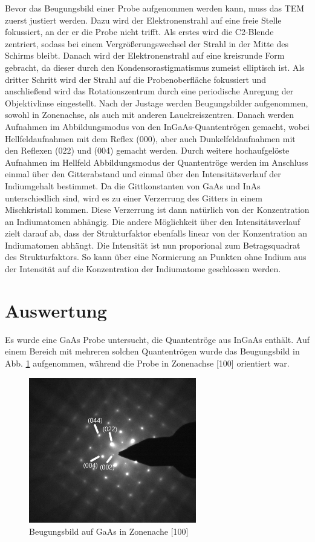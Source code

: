 \documentclass[a4paper,11pt,DIV=11]{scrartcl}
\begin{document}
Bevor das Beugungsbild einer Probe aufgenommen werden kann, muss das TEM zuerst justiert werden. Dazu wird der Elektronenstrahl auf eine freie Stelle fokussiert, an der er die Probe nicht trifft. Als erstes wird die C2-Blende zentriert, sodass bei einem Vergrößerungswechsel der Strahl in der Mitte des Schirms bleibt. Danach wird der Elektronenstrahl auf eine kreisrunde Form gebracht, da dieser durch den Kondensorastigmatismus zumeist elliptisch ist. Als dritter Schritt wird der Strahl auf die Probenoberfläche fokussiert und anschließend wird das Rotationszentrum durch eine periodische Anregung der Objektivlinse eingestellt. Nach der Justage werden Beugungsbilder aufgenommen, sowohl in Zonenachse, als auch mit anderen Lauekreiszentren. Danach werden Aufnahmen im Abbildungsmodus von den InGaAs-Quantentrögen gemacht, wobei Hellfeldaufnahmen mit dem Reflex (000), aber auch Dunkelfeldaufnahmen mit den Reflexen (022) und (004) gemacht werden. Durch weitere hochaufgelöste Aufnahmen im Hellfeld Abbildungsmodus der Quantentröge werden im Anschluss einmal über den Gitterabstand und einmal über den Intensitätsverlauf der Indiumgehalt bestimmet. Da die Gittkonstanten von GaAs und InAs unterschiedlich sind, wird es zu einer Verzerrung des Gitters in einem Mischkristall kommen. Diese Verzerrung ist dann natürlich von der Konzentration an Indiumatomen abhängig. Die andere Möglichkeit über den Intensitätsverlauf zielt darauf ab, dass der Strukturfaktor ebenfalls linear von der Konzentration an Indiumatomen abhängt. Die Intensität ist nun proporional zum Betragsquadrat des Strukturfaktors. So kann über eine Normierung an Punkten ohne Indium aus der Intensität auf die Konzentration der Indiumatome geschlossen werden.

\section{Auswertung}

Es wurde eine GaAs Probe untersucht, die Quantentröge aus InGaAs enthält. Auf einem Bereich mit mehreren solchen Quantentrögen wurde das Beugungsbild in Abb. \ref{100ind} aufgenommen, während die Probe in Zonenachse [100] orientiert war.

\begin{figure}[h]\centering
	\includegraphics[width=0.65\textwidth]{Versuchsdaten/8/indiziert2.png}
\caption{Beugungsbild auf GaAs in Zonenache [100]}
\label{100ind}
\end{figure}
\end{document}

